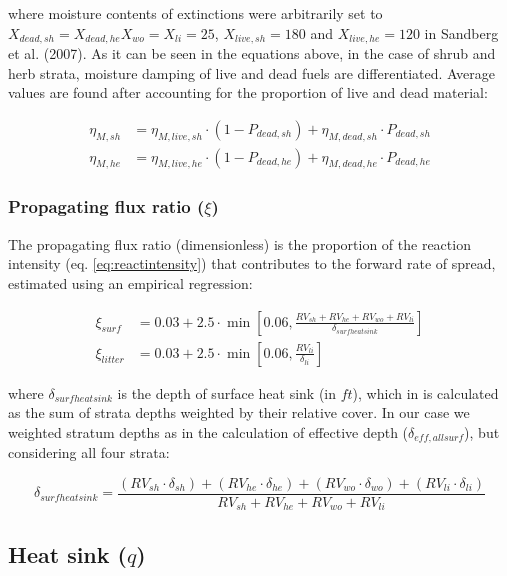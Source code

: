 \documentclass[]{book}
\begin{document}
where moisture contents of extinctions were arbitrarily set to
\(X_{dead, sh} = X_{dead, he} X_{wo} = X_{li} = 25\),
\(X_{live, sh} = 180\) and \(X_{live, he} = 120\) in Sandberg et al.
(2007). As it can be seen in the equations above, in the case of shrub
and herb strata, moisture damping of live and dead fuels are
differentiated. Average values are found after accounting for the
proportion of live and dead material:

\begin{eqnarray}
\eta_{M, sh} &= \eta_{M, live, sh} \cdot (1 - P_{dead, sh})+ \eta_{M, dead, sh} \cdot P_{dead, sh}\\
\eta_{M, he} &= \eta_{M, live, he} \cdot (1 - P_{dead, he})+ \eta_{M, dead, he} \cdot P_{dead, he}
\end{eqnarray}

\subsubsection{\texorpdfstring{Propagating flux ratio
(\(\xi\))}{Propagating flux ratio (\textbackslash{}xi)}}\label{propagating-flux-ratio-xi}

The propagating flux ratio (dimensionless) is the proportion of the
reaction intensity (eq. \eqref{eq:reactintensity}) that contributes to the
forward rate of spread, estimated using an empirical regression:

\begin{eqnarray}
\xi_{surf} &= 0.03 + 2.5 \cdot \min \left[0.06, \frac{RV_{sh}+RV_{he}+RV_{wo}+RV_{li}}{\delta_{surfheatsink}} \right]\\
\xi_{litter} &= 0.03 + 2.5 \cdot \min \left[0.06, \frac{RV_{li}}{\delta_{li}} \right]
\end{eqnarray}

where \(\delta_{surfheatsink}\) is the depth of surface heat sink (in
\(ft\)), which in \citet{Prichard2013} is calculated as the sum of
strata depths weighted by their relative cover. In our case we weighted
stratum depths as in the calculation of effective depth
(\(\delta_{eff, allsurf}\)), but considering all four strata:

\begin{equation}
\delta_{surfheatsink} = \frac{(RV_{sh}\cdot \delta_{sh}) +(RV_{he}\cdot \delta_{he}) + (RV_{wo}\cdot \delta_{wo})+ (RV_{li}\cdot \delta_{li})}{RV_{sh} +RV_{he}+RV_{wo}+RV_{li}}
\end{equation}

\subsection{\texorpdfstring{Heat sink
(\(q\))}{Heat sink (q)}}\label{heat-sink-q}
\end{document}
